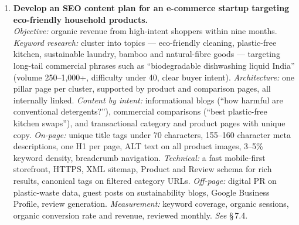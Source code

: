\begin{enumerate}[leftmargin=2.2em,itemsep=1.4ex]
\item \textbf{Develop an SEO content plan for an e-commerce startup targeting
      eco-friendly household products.} \\
      \emph{Objective:} organic revenue from high-intent shoppers within nine
      months. \emph{Keyword research:} cluster into topics --- eco-friendly
      cleaning, plastic-free kitchen, sustainable laundry, bamboo and
      natural-fibre goods --- targeting long-tail commercial phrases such as
      ``biodegradable dishwashing liquid India'' (volume 250--1,000+, difficulty
      under 40, clear buyer intent). \emph{Architecture:} one pillar page per
      cluster, supported by product and comparison pages, all internally linked.
      \emph{Content by intent:} informational blogs (``how harmful are
      conventional detergents?''), commercial comparisons (``best plastic-free
      kitchen swaps''), and transactional category and product pages with unique
      copy. \emph{On-page:} unique title tags under 70 characters, 155--160
      character meta descriptions, one H1 per page, ALT text on all product
      images, 3--5\% keyword density, breadcrumb navigation.
      \emph{Technical:} a fast mobile-first storefront, HTTPS, XML sitemap,
      Product and Review schema for rich results, canonical tags on filtered
      category URLs. \emph{Off-page:} digital PR on plastic-waste data, guest
      posts on sustainability blogs, Google Business Profile, review generation.
      \emph{Measurement:} keyword coverage, organic sessions, organic conversion
      rate and revenue, reviewed monthly. \hfill\emph{See} \S\,7.4.


\end{enumerate}
